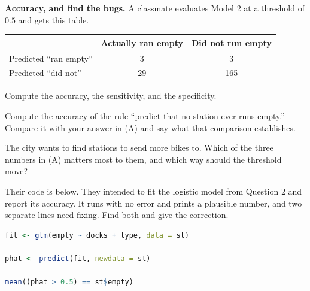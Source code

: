 \documentclass[11pt]{article}
\newcommand{\answerspace}[1]{\vspace{#1}}
\begin{document}
\begin{questions}
\item \textbf{Accuracy, and find the bugs.} A classmate evaluates Model 2 at a threshold of $0.5$
and gets this table.

\begin{center}
\renewcommand{\arraystretch}{1.3}
\begin{tabular}{lcc}
\toprule
 & \textbf{Actually ran empty} & \textbf{Did not run empty} \\
\midrule
Predicted ``ran empty'' & 3 & 3 \\
Predicted ``did not'' & 29 & 165 \\
\bottomrule
\end{tabular}
\end{center}

\begin{parts}
\item Compute the accuracy, the sensitivity, and the specificity.
\answerspace{4.5em}

\item Compute the accuracy of the rule ``predict that no station ever runs empty.'' Compare it with
your answer in (A) and say what that comparison establishes.
\answerspace{4em}

\item The city wants to find stations to send more bikes to. Which of the three numbers in (A)
matters most to them, and which way should the threshold move?
\answerspace{4em}

\item Their code is below. They intended to fit the logistic model from Question 2 and report its
accuracy. It runs with no error and prints a plausible number, and two separate lines need fixing.
Find both and give the correction.

\begin{lstlisting}[language=R]
fit <- glm(empty ~ docks + type, data = st)

phat <- predict(fit, newdata = st)

mean((phat > 0.5) == st$empty)
\end{lstlisting}
\answerspace{5.5em}
\end{parts}

\end{questions}
\end{document}
